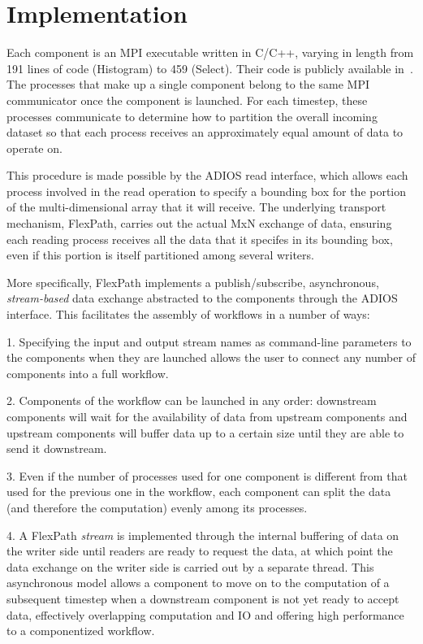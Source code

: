 \section{Implementation}
\label{s:impl}

Each component is an MPI executable
written in C/C++, varying in length from
191 lines of code (Histogram) to
459 (Select).
Their code is publicly available
in~\cite{champsaur:superglue-repo}.
The processes that make up a single
component belong to the same MPI communicator
once the component is launched.
For each timestep, these processes
communicate to determine how to partition
the overall incoming dataset so that each
process receives an approximately
equal amount of data to operate on.

This procedure is made possible by the ADIOS
read interface, which allows each process
involved in the read operation to specify a
bounding box for the portion of the multi-dimensional
array that it will receive.
The underlying transport mechanism, FlexPath,
carries out the actual MxN exchange of data,
ensuring each reading process receives
all the data that it specifes in its bounding box,
even if this portion is itself partitioned among several writers.

More specifically, FlexPath implements a publish/subscribe,
asynchronous, \textit{stream-based} data exchange abstracted to the
components through the ADIOS interface. This facilitates
the assembly of \sys workflows in a number of ways:

1. Specifying the input and output stream
names as command-line parameters to the \sys components 
when they are launched allows the user
to connect any number of components into
a full workflow.

2. Components of the workflow can be
launched in any order: downstream components
will wait for the availability of data from
upstream components and upstream
components will buffer data up to a certain
size until they are able to send it
downstream.

3. Even if the number of processes used for one
component is different from that used for the previous
one in the workflow, each component can split the data
(and therefore the computation) evenly among its processes.

4. A FlexPath \textit{stream} is implemented through
the internal buffering of data on the writer side
until readers are ready to request the data,
at which point the data exchange
on the writer side is carried out
by a separate thread.
This asynchronous model allows a 
\sys component to move on to the computation
of a subsequent timestep when a downstream
component is not yet ready to accept data,
effectively overlapping computation and IO
and offering high performance to a componentized workflow.

